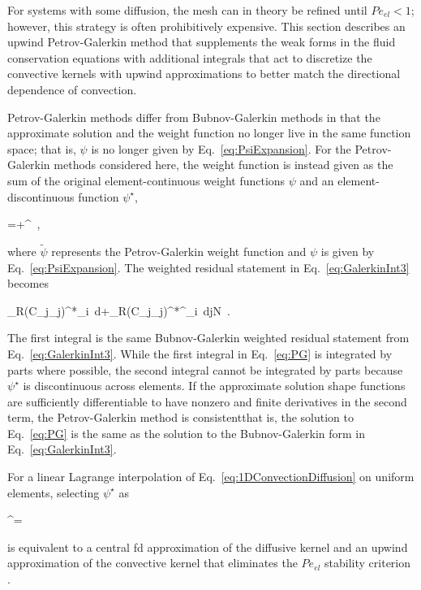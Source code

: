 For systems with some diffusion, the mesh can in theory be refined until \(Pe_{el}<1\); however, this strategy is often prohibitively expensive. This section describes an upwind Petrov-Galerkin method that supplements the weak forms in the fluid conservation equations with additional integrals that act to discretize the convective kernels with upwind approximations to better match the directional dependence of convection.

Petrov-Galerkin methods differ from Bubnov-Galerkin methods in that the approximate solution and the weight function no longer live in the same function space; that is, \(\psi\) is no longer given by Eq.\ \eqref{eq:PsiExpansion}. For the Petrov-Galerkin methods considered here, the weight function is instead given as the sum of the original element-continuous weight functions \(\psi\) and an element-discontinuous function \(\psi^\star\),

\beq
\label{eq:pgwf}
\tilde{\psi}=\psi+\psi^\star\ ,
\eeq

\noindent where \(\tilde{\psi}\) represents the Petrov-Galerkin weight function and \(\psi\) is given by Eq.\ \eqref{eq:PsiExpansion}. The weighted residual statement in Eq.\ \eqref{eq:GalerkinInt3} becomes

\beq
\label{eq:PG}
\int_{\Omega}\left\lbrack R\left(C_j\phi_j\right)\right\rbrack^*\phi_i\ d\Omega+\int_{\Omega}\left\lbrack R\left(C_j\phi_j\right)\right\rbrack^*\psi^\star_i\ d\hspace{1cm}j\in N\ .
\eeq

\noindent The first integral is the same Bubnov-Galerkin weighted residual statement from Eq.\ \eqref{eq:GalerkinInt3}. While the first integral in Eq.\ \eqref{eq:PG} is integrated by parts where possible, the second integral cannot be integrated by parts because \(\psi^\star\) is discontinuous across elements. If the approximate solution shape functions are sufficiently differentiable to have nonzero and finite derivatives in the second term, the Petrov-Galerkin method is consistent\mdash that is, the solution to Eq.\ \eqref{eq:PG} is the same as the solution to the Bubnov-Galerkin form in Eq.\ \eqref{eq:GalerkinInt3}.

For a linear Lagrange interpolation of Eq.\ \eqref{eq:1DConvectionDiffusion} on uniform elements, selecting \(\psi^\star\) as

\beq
\label{eq:psiStar}
\psi^\star=\cdot\nabla\psi\ 
\eeq

\noindent is equivalent to a central \gls{fd} approximation of the diffusive kernel and an upwind approximation of the convective kernel that eliminates the \(Pe_{el}\) stability criterion \cite{zienkiewicz,brooks,novak_manual}. 

